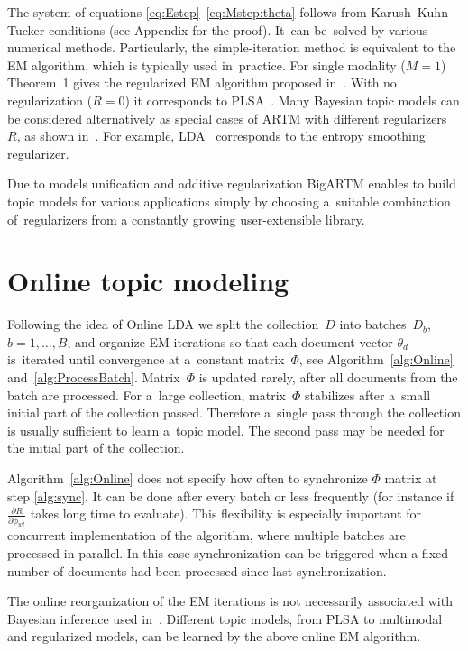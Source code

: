 \documentclass{llncs}
\begin{document}
The system of equations \eqref{eq:Estep}--\eqref{eq:Mstep:theta}
follows from Karush--Kuhn--Tucker conditions (see Appendix for the proof).
It~can be~solved by various numerical methods.
Particularly,
the simple-iteration method is equivalent to the EM algorithm,
which is typically used in~practice.
For single modality (${M=1}$) Theorem~1 gives the regularized EM algorithm
proposed in~\cite{voron14dan-eng}.
With no regularization (${R=0}$) it corresponds to PLSA~\cite{hofmann99plsi}.
Many Bayesian topic models can be considered alternatively
as special cases of ARTM with different regularizers~$R$,
as shown in~\cite{voron14aist,voron14mlj}.
For example,
LDA~\cite{blei03latent} corresponds to the entropy smoothing regularizer.

Due to models unification and additive regularization
BigARTM enables to build topic models for various applications
simply by choosing a~suitable combination of~regularizers
from a constantly growing user-extensible library.

\section{Online topic modeling}
\label{sec:Online}

Following the idea of Online LDA \cite{hoffman10online}
we split the collection~$D$ into batches~$D_b$, ${b=1,\dots,B}$,
and organize EM iterations so that
each document vector $\theta_d$ is~iterated until convergence at a~constant matrix~$\Phi$,
see Algorithm~\ref{alg:Online} and~\ref{alg:ProcessBatch}.
Matrix~$\Phi$ is updated rarely, after all documents from the batch are processed.
For a~large collection,
matrix~$\Phi$ stabilizes after a~small initial part of the collection passed.
Therefore a~single pass through the collection is usually sufficient to learn a~topic model.
The second pass may be needed for the initial part of the collection.

Algorithm~\ref{alg:Online} does not specify how often to synchronize $\Phi$ matrix at step \ref{alg:sync}.
It can be done after every batch or less frequently
(for instance if $\frac{\partial R}{\partial \phi_{wt}}$ takes long time to evaluate).
This flexibility is especially important for concurrent implementation of the algorithm,
where multiple batches are processed in parallel.
In this case synchronization can be triggered when a fixed number of documents had been processed since last synchronization.

The online reorganization of the EM iterations
is not necessarily associated with Bayesian inference used in~\cite{hoffman10online}.
Different topic models, from PLSA to multimodal and regularized models,
can be learned by the above online EM algorithm.
\end{document}
